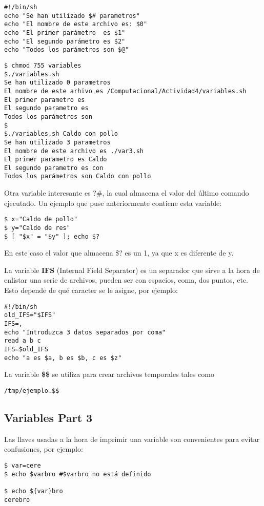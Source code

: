 \documentclass[a4paper]{article}
\begin{document}
\begin{verbatim}
#!/bin/sh
echo "Se han utilizado $# parametros"
echo "El nombre de este archivo es: $0"
echo "El primer parámetro  es $1"
echo "El segundo parámetro es $2"
echo "Todos los parámetros son $@"
\end{verbatim}

\begin{verbatim}
$ chmod 755 variables
$./variables.sh
Se han utilizado 0 parametros
El nombre de este arhivo es /Computacional/Actividad4/variables.sh
El primer parametro es 
El segundo parametro es  
Todos los parámetros son
$
$./variables.sh Caldo con pollo
Se han utilizado 3 parametros
El nombre de este archivo es ./var3.sh
El primer parametro es Caldo
El segundo parametro es con
Todos los parámetros son Caldo con pollo
\end{verbatim}

Otra variable interesante es ?\#, la cual almacena el valor del último comando ejecutado. Un ejemplo que puse anteriormente contiene esta variable:

\begin{verbatim}
$ x="Caldo de pollo"
$ y="Caldo de res"
$ [ "$x" = "$y" ]; echo $? 

\end{verbatim}
En este caso el valor que almacena \$? es un 1, ya que x es diferente de y. 

La variable \textbf{IFS} (Internal Field Separator) es un separador que sirve a la hora de enlistar una serie de archivos, pueden ser con espacios, coma, dos puntos, etc. Esto depende de qué caracter se le asigne, por ejemplo:

\begin{verbatim}
#!/bin/sh
old_IFS="$IFS"
IFS=,
echo "Introduzca 3 datos separados por coma"
read a b c
IFS=$old_IFS
echo "a es $a, b es $b, c es $z"
\end{verbatim}

La variable \textbf{\$\$} se utiliza para crear archivos temporales tales como 
\begin{verbatim}
/tmp/ejemplo.$$
\end{verbatim}

\subsection{Variables Part 3}
Las llaves usadas a la hora de imprimir una variable son convenientes para evitar confusiones, por ejemplo:

\begin{verbatim}
$ var=cere
$ echo $varbro #$varbro no está definido

$ echo ${var}bro 
cerebro
\end{verbatim}
\end{document}
